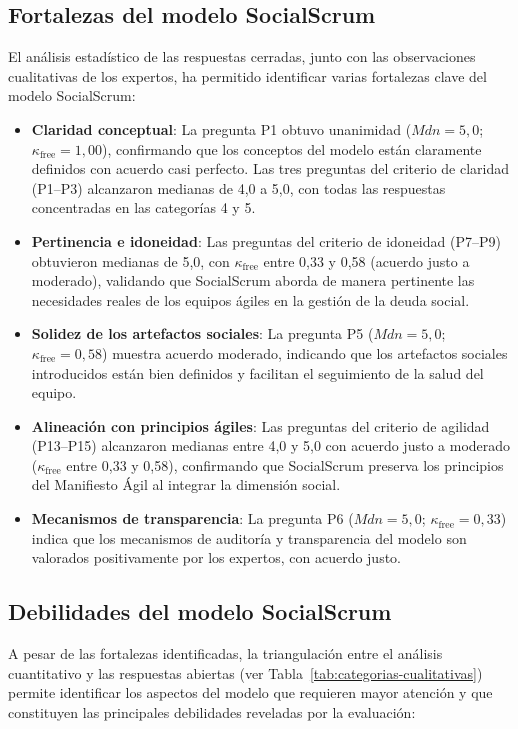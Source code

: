 \subsection{Fortalezas del modelo SocialScrum}
El análisis estadístico de las respuestas cerradas, junto con las observaciones cualitativas de los expertos, ha permitido identificar varias fortalezas clave del modelo SocialScrum:

\begin{itemize}
    \item \textbf{Claridad conceptual}: La pregunta P1 obtuvo unanimidad ($Mdn = 5{,}0$; $\kappa_{\text{free}} = 1{,}00$), confirmando que los conceptos del modelo están claramente definidos con acuerdo casi perfecto. Las tres preguntas del criterio de claridad (P1--P3) alcanzaron medianas de 4,0 a 5,0, con todas las respuestas concentradas en las categorías 4 y 5.
    \item \textbf{Pertinencia e idoneidad}: Las preguntas del criterio de idoneidad (P7--P9) obtuvieron medianas de 5,0, con $\kappa_{\text{free}}$ entre 0,33 y 0,58 (acuerdo justo a moderado), validando que SocialScrum aborda de manera pertinente las necesidades reales de los equipos ágiles en la gestión de la deuda social.
    \item \textbf{Solidez de los artefactos sociales}: La pregunta P5 ($Mdn = 5{,}0$; $\kappa_{\text{free}} = 0{,}58$) muestra acuerdo moderado, indicando que los artefactos sociales introducidos están bien definidos y facilitan el seguimiento de la salud del equipo.
    \item \textbf{Alineación con principios ágiles}: Las preguntas del criterio de agilidad (P13--P15) alcanzaron medianas entre 4,0 y 5,0 con acuerdo justo a moderado ($\kappa_{\text{free}}$ entre 0,33 y 0,58), confirmando que SocialScrum preserva los principios del Manifiesto Ágil al integrar la dimensión social.
    \item \textbf{Mecanismos de transparencia}: La pregunta P6 ($Mdn = 5{,}0$; $\kappa_{\text{free}} = 0{,}33$) indica que los mecanismos de auditoría y transparencia del modelo son valorados positivamente por los expertos, con acuerdo justo.
\end{itemize}

\subsection{Debilidades del modelo SocialScrum}
A pesar de las fortalezas identificadas, la triangulación entre el análisis cuantitativo y las respuestas abiertas (ver Tabla~\ref{tab:categorias-cualitativas}) permite identificar los aspectos del modelo que requieren mayor atención y que constituyen las principales debilidades reveladas por la evaluación:

